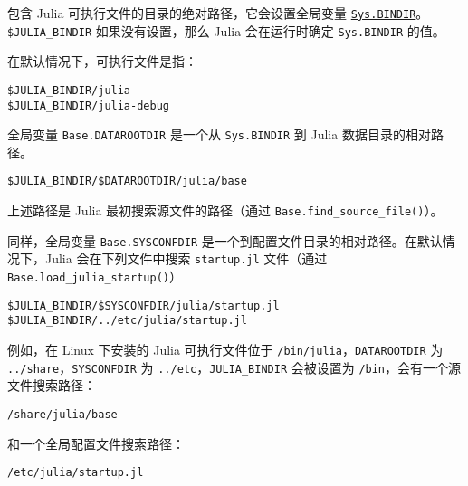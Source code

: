 包含 Julia 可执行文件的目录的绝对路径，它会设置全局变量 \hyperlink{11034333937761980027}{\texttt{Sys.BINDIR}}。\texttt{\$JULIA\_BINDIR} 如果没有设置，那么 Julia 会在运行时确定 \texttt{Sys.BINDIR} 的值。



在默认情况下，可执行文件是指：




\begin{lstlisting}
$JULIA_BINDIR/julia
$JULIA_BINDIR/julia-debug
\end{lstlisting}



全局变量 \texttt{Base.DATAROOTDIR} 是一个从 \texttt{Sys.BINDIR} 到 Julia 数据目录的相对路径。




\begin{lstlisting}
$JULIA_BINDIR/$DATAROOTDIR/julia/base
\end{lstlisting}



上述路径是 Julia 最初搜索源文件的路径（通过 \texttt{Base.find\_source\_file()}）。



同样，全局变量 \texttt{Base.SYSCONFDIR} 是一个到配置文件目录的相对路径。在默认情况下，Julia 会在下列文件中搜索 \texttt{startup.jl} 文件（通过 \texttt{Base.load\_julia\_startup()}）




\begin{lstlisting}
$JULIA_BINDIR/$SYSCONFDIR/julia/startup.jl
$JULIA_BINDIR/../etc/julia/startup.jl
\end{lstlisting}



例如，在 Linux 下安装的 Julia 可执行文件位于 \texttt{/bin/julia}，\texttt{DATAROOTDIR} 为 \texttt{../share}，\texttt{SYSCONFDIR} 为 \texttt{../etc}，\texttt{JULIA\_BINDIR} 会被设置为 \texttt{/bin}，会有一个源文件搜索路径：




\begin{lstlisting}
/share/julia/base
\end{lstlisting}



和一个全局配置文件搜索路径：




\begin{lstlisting}
/etc/julia/startup.jl
\end{lstlisting}



